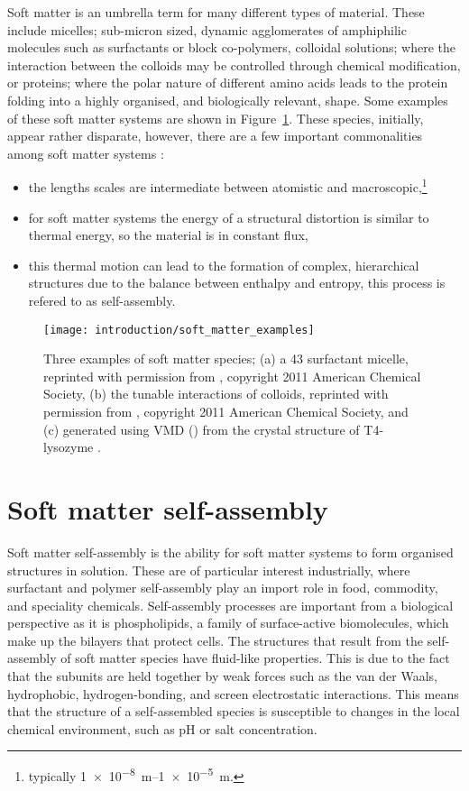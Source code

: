 Soft matter is an umbrella term for many different types of material.
These include micelles; sub-micron sized, dynamic agglomerates of amphiphilic molecules such as surfactants or block co-polymers, colloidal solutions; where the interaction between the colloids may be controlled through chemical modification, or proteins; where the polar nature of different amino acids leads to the protein folding into a highly organised, and biologically relevant, shape.
Some examples of these soft matter systems are shown in Figure~\ref{fig:soft}.
These species, initially, appear rather disparate, however, there are a few important commonalities among soft matter systems \autocite{jones_soft_2002}:
\begin{itemize}
  \item the lengths scales are intermediate between atomistic and macroscopic,\footnote{typically \SIrange{1e-8}{1e-5}{\meter}.}
  \item for soft matter systems the energy of a structural distortion is similar to thermal energy, so the material is in constant flux,
  \item this thermal motion can lead to the formation of complex, hierarchical structures due to the balance between enthalpy and entropy, this process is refered to as self-assembly.
\end{itemize}
%
\begin{figure}
    \centering
    \texttt{[image: introduction/soft\_matter\_examples]}
    \caption{Three examples of soft matter species; (a) a 43  surfactant micelle, reprinted with permission from \cite{hargreaves_atomistic_2011}, copyright 2011 American Chemical Society, (b) the tunable interactions of colloids, reprinted with permission from \cite{kraft_patchy_2011}, copyright 2011 American Chemical Society, and (c) generated using VMD (\cite{humphrey_vmd_1996}) from the crystal structure of T4-lysozyme \cite{rose_crystal_1988}.}
    \label{fig:soft}
\end{figure}
%

\section{Soft matter self-assembly}
Soft matter self-assembly is the ability for soft matter systems to form organised structures in solution.
These are of particular interest industrially, where surfactant and polymer self-assembly play an import role in food, commodity, and speciality chemicals.\autocite{schramm_surfactants_2003}
Self-assembly processes are important from a biological perspective as it is phospholipids, a family of surface-active biomolecules, which make up the bilayers that protect cells.\autocite{simons_lipid_2000}
The structures that result from the self-assembly of soft matter species have fluid-like properties.
This is due to the fact that the subunits are held together by weak forces such as the van der Waals, hydrophobic, hydrogen-bonding, and screen electrostatic interactions.\autocite{israelachvili_intermolecular_2011}
This means that the structure of a self-assembled species is susceptible to changes in the local chemical environment, such as pH or salt concentration.\autocite{schmaljohann_thermo-_2006,sammalkorpi_ionic_2009}

